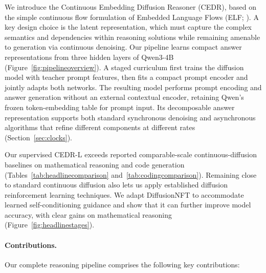 \documentclass[11pt,letterpaper]{article}
\begin{document}
We introduce the Continuous Embedding Diffusion Reasoner (CEDR), based on the simple continuous flow formulation of Embedded Language Flows (ELF; \citealp{elf}). A key design choice is the latent representation, which must capture the complex semantics and dependencies within reasoning solutions while remaining amenable to generation via continuous denoising. Our pipeline learns compact answer representations from three hidden layers of Qwen3-4B \citep{qwen3} (Figure~\ref{fig:pipelineoverview}). A staged curriculum first trains the diffusion model with teacher prompt features, then fits a compact prompt encoder and jointly adapts both networks. The resulting model performs prompt encoding and answer generation without an external contextual encoder, retaining Qwen's frozen token-embedding table for prompt input. Its decomposable answer representation supports both standard synchronous denoising and asynchronous algorithms that refine different components at different rates (Section~\ref{sec:clocks}).

Our supervised CEDR-L exceeds reported comparable-scale continuous-diffusion baselines on mathematical reasoning and code generation (Tables~\ref{tab:headlinecomparison} and~\ref{tab:codingcomparison}). Remaining close to standard continuous diffusion also lets us apply established diffusion reinforcement learning techniques. We adapt DiffusionNFT \citep{diffusionnft} to accommodate learned self-conditioning guidance and show that it can further improve model accuracy, with clear gains on mathematical reasoning (Figure~\ref{fig:headlinestages}).

\paragraph{Contributions.}
\label{sec:contributions}

Our complete reasoning pipeline comprises the following key contributions:
\end{document}
